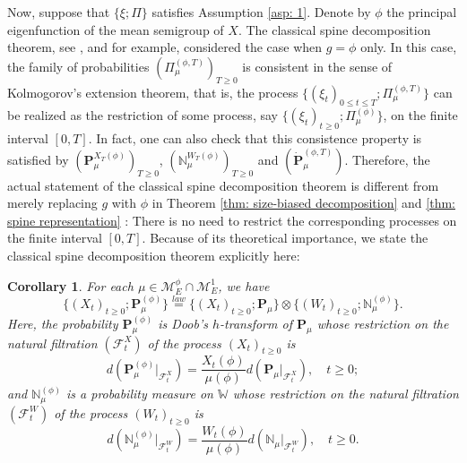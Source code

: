 \documentclass[12pt, a4paper]{amsart}
\newtheorem{cro}[thm]{Corollary}
\theoremstyle{definition}
\numberwithin{equation}{section}
\begin{document}
	Now, suppose that $\{\xi; \Pi\}$ satisfies Assumption \ref{asp: 1}.
	Denote by $\phi$ the principal eigenfunction of the mean semigroup of $X$.
	The classical spine decomposition theorem, see \cite{EckhoffKyprianouWinkel2015Spines}, \cite{EnglanderKyprianou2004Local} and \cite{LiuRenSong2009Llog} for example, considered the case when $g = \phi$ only.
	In this case, the family of probabilities $(\Pi_{\mu}^{(\phi,T)})_{T\geq 0}$ is consistent in the sense of Kolmogorov's extension theorem, that is,  the process $\{(\xi_t)_{0\leq t\leq T}; \Pi_{\mu}^{(\phi,T)} \}$ can be realized as the restriction of some process, say $\{(\xi_t)_{t\geq 0}; \Pi_{\mu}^{(\phi)}\}$, on the finite interval $[0,T]$.
	In fact, one can also check that this consistence property is satisfied by  $(\mathbf P_\mu^{X_T(\phi)} )_{T\geq 0}$, $(\mathbb N^{W_T(\phi)}_\mu)_{T\geq 0}$ and $(\dot {\mathbf P}^{(\phi,T)}_\mu)$.
	Therefore, the actual statement of the classical spine decomposition theorem is
	different
	from merely replacing $g$ with $\phi$ in Theorem \ref{thm: size-biased decomposition} and \ref{thm: spine representation}
	: There is
	no need to restrict the corresponding processes on the finite interval $[0,T]$.
	Because of its theoretical importance, we state the classical spine decomposition theorem explicitly here:
	
\begin{cro}
	For each $\mu \in \mathcal M_E^\phi \cap \mathcal M_E^1$, we have
\[
	\{(X_t)_{t\geq 0}; \mathbf P_\mu^{(\phi)}\}
	\overset{law}{=} \{(X_t)_{t\geq 0}; \mathbf P_\mu \} \otimes \{(W_t)_{t\geq 0}; \mathbb N^{(\phi)}_\mu\}.
\]
	Here, the probability $\mathbf P_\mu^{(\phi)}$ is Doob's $h$-transform of $\mathbf P_\mu$ whose restriction on the natural filtration $(\mathscr F_t^X)$ of the process $(X_t)_{t\geq 0}$ is
\[
	d ( \mathbf P_\mu^{(\phi)}|_{\mathscr F_t^X}) = \frac{X_t(\phi)}{ \mu(\phi)} d(\mathbf P_\mu|_{\mathscr F_t^X}),
	\quad t\geq 0;
\]
	and $\mathbb N_\mu^{(\phi)}$ is a probability measure on $\mathbb W$ whose restriction on the natural filtration $(\mathscr F_t^W)$ of the process $(W_t)_{t\geq 0}$ is
\[
	d(\mathbb N_\mu^{(\phi)} |_{\mathscr F^W_t}  )
	= \frac{W_t(\phi)}{\mu(\phi)} d(\mathbb N_\mu |_{\mathscr F^W_t}  ),
	\quad t\geq 0.
\]
\end{cro}
\end{document}
